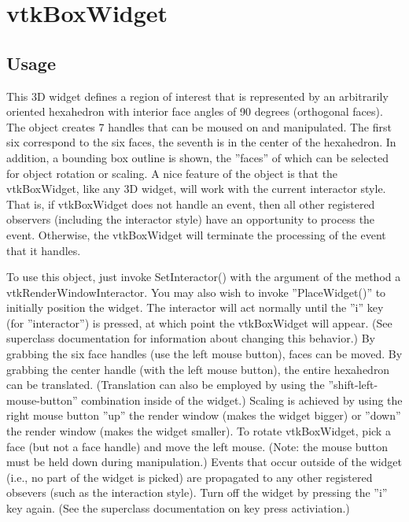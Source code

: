 \section{vtkBoxWidget}

\subsection{Usage}

 This 3D widget defines a region of interest that is represented by an
 arbitrarily oriented hexahedron with interior face angles of 90 degrees
 (orthogonal faces). The object creates 7 handles that can be moused on and
 manipulated. The first six correspond to the six faces, the seventh is in
 the center of the hexahedron. In addition, a bounding box outline is shown,
 the ''faces'' of which can be selected for object rotation or scaling. A
 nice feature of the object is that the vtkBoxWidget, like any 3D widget,
 will work with the current interactor style. That is, if vtkBoxWidget does
 not handle an event, then all other registered observers (including the
 interactor style) have an opportunity to process the event. Otherwise, the
 vtkBoxWidget will terminate the processing of the event that it handles.

 To use this object, just invoke SetInteractor() with the argument of the
 method a vtkRenderWindowInteractor.  You may also wish to invoke
 ''PlaceWidget()'' to initially position the widget. The interactor will act
 normally until the ''i'' key (for ''interactor'') is pressed, at which point the
 vtkBoxWidget will appear. (See superclass documentation for information
 about changing this behavior.) By grabbing the six face handles (use the
 left mouse button), faces can be moved. By grabbing the center handle
 (with the left mouse button), the entire hexahedron can be
 translated. (Translation can also be employed by using the
 ''shift-left-mouse-button'' combination inside of the widget.) Scaling is
 achieved by using the right mouse button ''up'' the render window (makes the
 widget bigger) or ''down'' the render window (makes the widget smaller). To
 rotate vtkBoxWidget, pick a face (but not a face handle) and move the left
 mouse. (Note: the mouse button must be held down during manipulation.)
 Events that occur outside of the widget (i.e., no part of the widget is
 picked) are propagated to any other registered obsevers (such as the
 interaction style).  Turn off the widget by pressing the ''i'' key again.
 (See the superclass documentation on key press activiation.)

